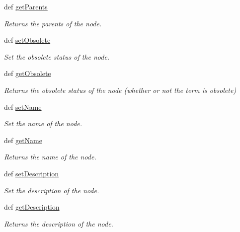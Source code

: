 \begin{DoxyCompactItemize}
def \hyperlink{class_g_o_node_1_1_g_o_node_adf49ff024c6b5cade07995c56256d9dd}{getParents}
\begin{DoxyCompactList}\small\item\em Returns the parents of the node. \item\end{DoxyCompactList}\item 
def \hyperlink{class_g_o_node_1_1_g_o_node_a038f04eff9f5d8486280bc70887515fa}{setObsolete}
\begin{DoxyCompactList}\small\item\em Set the obsolete status of the node. \item\end{DoxyCompactList}\item 
def \hyperlink{class_g_o_node_1_1_g_o_node_ac965c13905434899a4c88f931f33e640}{getObsolete}
\begin{DoxyCompactList}\small\item\em Returns the obsolete status of the node (whether or not the term is obsolete) \item\end{DoxyCompactList}\item 
def \hyperlink{class_g_o_node_1_1_g_o_node_ab48dc024009773f22884b5a7c75d17cd}{setName}
\begin{DoxyCompactList}\small\item\em Set the name of the node. \item\end{DoxyCompactList}\item 
def \hyperlink{class_g_o_node_1_1_g_o_node_a00e15671c0ef26e70eda632da8518ee9}{getName}
\begin{DoxyCompactList}\small\item\em Returns the name of the node. \item\end{DoxyCompactList}\item 
def \hyperlink{class_g_o_node_1_1_g_o_node_a6da2fec8371255c0728c3bed095ab4f9}{setDescription}
\begin{DoxyCompactList}\small\item\em Set the description of the node. \item\end{DoxyCompactList}\item 
def \hyperlink{class_g_o_node_1_1_g_o_node_acaadece0d9dc2efabf97c71dd438de6f}{getDescription}
\begin{DoxyCompactList}\small\item\em Returns the description of the node. \item\end{DoxyCompactList}\item 

\end{DoxyCompactItemize}
